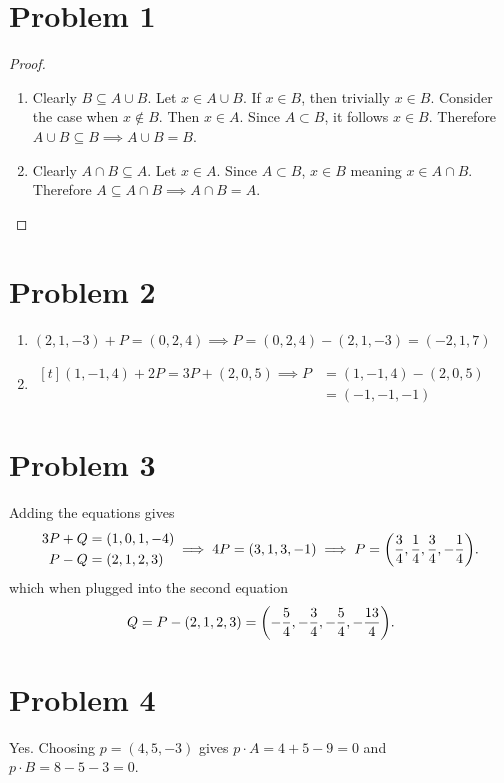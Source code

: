 \documentclass{eeleyes}
\begin{document}
\section*{Problem 1}
\begin{proof}
    \hfill
    \begin{enumerate}[label=\roman*)]
        \item Clearly $B \subseteq A \cup B$. Let $x \in A \cup B$. If $x \in B$, then trivially $x \in B$. Consider the case when $x \notin B$. Then $x \in A$. Since $A \subset B$, it follows $x \in B$. Therefore $A \cup B \subseteq B \implies A \cup B = B$.
        \item Clearly $A \cap B \subseteq A$. Let $x \in A$. Since $A \subset B$, $x \in B$ meaning $x \in A \cap B$. Therefore $A \subseteq A \cap B \implies A \cap B = A$. \qedhere
    \end{enumerate}
\end{proof}

\section*{Problem 2}
\begin{enumerate}[label=\alph*)]
    \item $(2, 1, -3) + P = (0, 2, 4) \implies P = (0, 2, 4) - (2, 1, -3) = (-2, 1, 7)$

    \item $\begin{aligned}[t]
        (1, -1, 4) + 2P = 3P + (2, 0, 5) \implies P &= (1, -1, 4) - (2, 0, 5)  \\
        &= (-1, -1, -1)
        \end{aligned}$

\end{enumerate}

\section*{Problem 3}
Adding the equations gives
\[
\begin{aligned}
    3P + Q &= (1, 0, 1, -4) \\
    P - Q &= (2, 1, 2, 3)
\end{aligned} 
\implies 
4P = (3, 1, 3, -1) \implies P = \qty(\frac{3}{4}, \frac{1}{4}, \frac{3}{4}, -\frac{1}{4})
.\]
which when plugged into the second equation
\[
    Q = P - (2,1,2,3) = \qty(-\frac{5}{4}, -\frac{3}{4}, -\frac{5}{4}, -\frac{13}{4})
.\]

\section*{Problem 4}
Yes. Choosing $p = (4,5,-3)$ gives $p \cdot A = 4 + 5 - 9 = 0$ and $p \cdot B = 8 - 5 - 3 = 0$.
\end{document}
